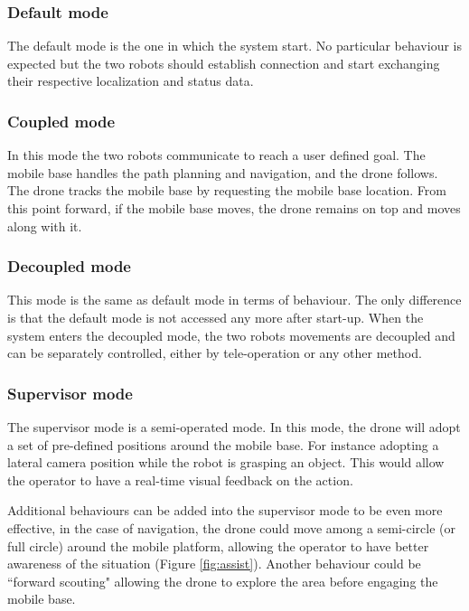 \documentclass[11pt,a4paper]{article}
\begin{document}
\subsubsection{Default mode}
The default mode is the one in which the system start. No particular behaviour is expected but the two
robots should establish connection and start exchanging their respective localization and status data.

\subsubsection{Coupled mode}
In this mode the two robots communicate to reach a user defined goal. The mobile base handles the path planning and navigation, and the drone follows. The drone tracks the mobile base by requesting the mobile base location. From this point forward, if the mobile base moves, the drone remains on top and moves along with it.

\subsubsection{Decoupled mode}
This mode is the same as default mode in terms of behaviour. The only difference is that the default mode
is not accessed any more after start-up. When the system enters the decoupled mode, the two robots movements
are decoupled and can be separately controlled, either by tele-operation or any other method.

\subsubsection{Supervisor mode}
The supervisor mode is a semi-operated mode. In this mode, the drone will adopt a set of pre-defined
positions around the mobile base. For
instance adopting a lateral camera position while the robot is grasping an object. This would
allow the operator to have a real-time visual feedback on the action. 



Additional behaviours can be added into the supervisor mode to be even more effective, in the case of navigation, the drone could move 
among a semi-circle (or full circle) around the mobile platform, allowing the 
operator to have better awareness of the situation (Figure \ref{fig:assist}). Another behaviour
could be ``forward scouting" allowing the drone to explore the area before engaging the 
mobile base.
\end{document}
